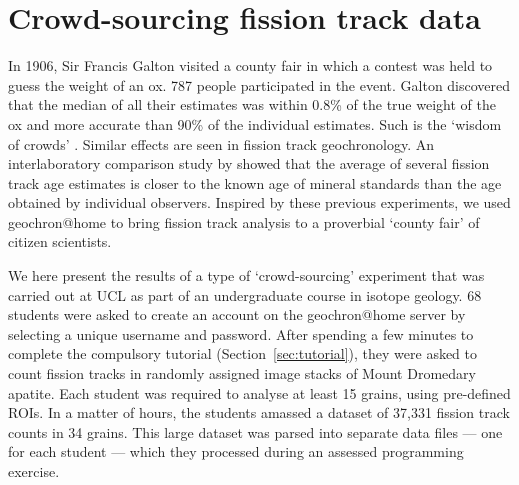 \documentclass{article}
\begin{document}
\section{Crowd-sourcing fission track data}\label{sec:crowdsourcing}

In 1906, Sir Francis Galton visited a county fair in which a contest
was held to guess the weight of an ox. 787 people participated in the
event. Galton discovered that the median of all their estimates was
within 0.8\% of the true weight of the ox and more accurate than 90\%
of the individual estimates. Such is the `wisdom of crowds'
\citep{galton1907a}. Similar effects are seen in fission track
geochronology. An interlaboratory comparison study by
\citet{miller1985} showed that the average of several fission track
age estimates is closer to the known age of mineral standards than the
age obtained by individual observers. Inspired by these previous
experiments, we used geochron@home to bring fission track analysis to
a proverbial `county fair' of citizen scientists.\medskip

We here present the results of a type of `crowd-sourcing' experiment
that was carried out at UCL as part of an undergraduate course in
isotope geology. 68 students were asked to create an account on the
geochron@home server by selecting a unique username and
password. After spending a few minutes to complete the compulsory
tutorial (Section~\ref{sec:tutorial}), they were asked to count
fission tracks in randomly assigned image stacks of Mount Dromedary
apatite. Each student was required to analyse at least 15 grains,
using pre-defined ROIs. In a matter of hours, the students amassed a
dataset of 37,331 fission track counts in 34 grains.  This large
dataset was parsed into separate data files --- one for each student
--- which they processed during an assessed programming
exercise.\medskip

\begin{small}
  \\
\end{small}
\label{tab:crowdtable}
\end{document}
